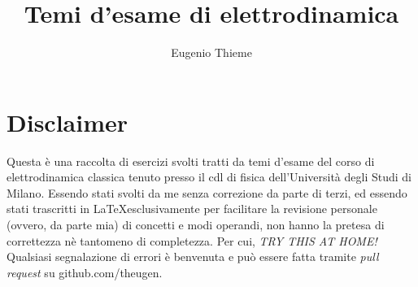 \documentclass[a4paper,11pt]{book}
\begin{document}
\author{Eugenio Thieme}
\title{Temi d'esame di elettrodinamica}
\maketitle
\tableofcontents
\section{Disclaimer}
Questa è una raccolta di esercizi svolti tratti da temi d'esame del corso
di elettrodinamica classica tenuto presso il cdl di fisica dell'Università
degli Studi di Milano.
Essendo stati svolti da me senza correzione da parte di terzi, ed essendo
stati trascritti in \LaTeX esclusivamente per facilitare la revisione personale (ovvero, da parte mia) di
concetti e modi operandi, non hanno la pretesa di correttezza nè tantomeno
di completezza. Per cui, \emph{TRY THIS AT HOME!}
Qualsiasi segnalazione di errori è benvenuta e può essere fatta tramite 
\emph{pull request} su github.com/theugen.
\end{document}
